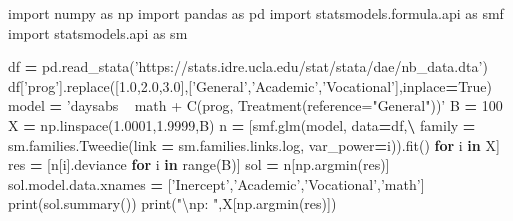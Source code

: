 \documentclass[polish,]{book}
\newenvironment{Shaded}{\begin{snugshade}}{\end{snugshade}}
\newcommand{\BuiltInTok}[1]{#1}
\newcommand{\CharTok}[1]{\textcolor[rgb]{0.31,0.60,0.02}{#1}}
\newcommand{\ControlFlowTok}[1]{\textcolor[rgb]{0.13,0.29,0.53}{\textbf{#1}}}
\newcommand{\DecValTok}[1]{\textcolor[rgb]{0.00,0.00,0.81}{#1}}
\newcommand{\FloatTok}[1]{\textcolor[rgb]{0.00,0.00,0.81}{#1}}
\newcommand{\ImportTok}[1]{#1}
\newcommand{\KeywordTok}[1]{\textcolor[rgb]{0.13,0.29,0.53}{\textbf{#1}}}
\newcommand{\NormalTok}[1]{#1}
\newcommand{\OperatorTok}[1]{\textcolor[rgb]{0.81,0.36,0.00}{\textbf{#1}}}
\newcommand{\StringTok}[1]{\textcolor[rgb]{0.31,0.60,0.02}{#1}}
\newcommand{\VariableTok}[1]{\textcolor[rgb]{0.00,0.00,0.00}{#1}}
\begin{document}
\begin{Shaded}
\begin{Highlighting}[]
\ImportTok{import}\NormalTok{ numpy }\ImportTok{as}\NormalTok{ np}
\ImportTok{import}\NormalTok{ pandas }\ImportTok{as}\NormalTok{ pd}
\ImportTok{import}\NormalTok{ statsmodels.formula.api }\ImportTok{as}\NormalTok{ smf}
\ImportTok{import}\NormalTok{ statsmodels.api }\ImportTok{as}\NormalTok{ sm}

\NormalTok{df }\OperatorTok{=}\NormalTok{ pd.read_stata(}\StringTok{'https://stats.idre.ucla.edu/stat/stata/dae/nb_data.dta'}\NormalTok{)}
\NormalTok{df[}\StringTok{'prog'}\NormalTok{].replace([}\FloatTok{1.0}\NormalTok{,}\FloatTok{2.0}\NormalTok{,}\FloatTok{3.0}\NormalTok{],[}\StringTok{'General'}\NormalTok{,}\StringTok{'Academic'}\NormalTok{,}\StringTok{'Vocational'}\NormalTok{],inplace}\OperatorTok{=}\VariableTok{True}\NormalTok{)}
\NormalTok{model }\OperatorTok{=} \StringTok{'daysabs ~ math + C(prog, Treatment(reference="General"))'}
\NormalTok{B }\OperatorTok{=} \DecValTok{100}
\NormalTok{X }\OperatorTok{=}\NormalTok{ np.linspace(}\FloatTok{1.0001}\NormalTok{,}\FloatTok{1.9999}\NormalTok{,B)}
\NormalTok{n }\OperatorTok{=}\NormalTok{ [smf.glm(model, data}\OperatorTok{=}\NormalTok{df,}\OperatorTok{\textbackslash{}}
\NormalTok{     family }\OperatorTok{=}\NormalTok{ sm.families.Tweedie(link }\OperatorTok{=}\NormalTok{ sm.families.links.log, var_power}\OperatorTok{=}\NormalTok{i)).fit() }\ControlFlowTok{for}\NormalTok{ i }\KeywordTok{in}\NormalTok{ X]}
\NormalTok{res }\OperatorTok{=}\NormalTok{ [n[i].deviance }\ControlFlowTok{for}\NormalTok{ i }\KeywordTok{in} \BuiltInTok{range}\NormalTok{(B)]}
\NormalTok{sol }\OperatorTok{=}\NormalTok{ n[np.argmin(res)]}
\NormalTok{sol.model.data.xnames }\OperatorTok{=}\NormalTok{ [}\StringTok{'Inercept'}\NormalTok{,}\StringTok{'Academic'}\NormalTok{,}\StringTok{'Vocational'}\NormalTok{,}\StringTok{'math'}\NormalTok{]}
\BuiltInTok{print}\NormalTok{(sol.summary())}
\BuiltInTok{print}\NormalTok{(}\StringTok{"}\CharTok{\textbackslash{}n}\StringTok{p: "}\NormalTok{,X[np.argmin(res)])}
\end{Highlighting}
\end{Shaded}
\end{document}
